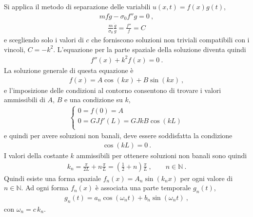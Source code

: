 \documentclass[letterpaper,10pt,italian]{jupyterBook}
\begin{document}
\sphinxAtStartPar
Si applica il metodo di separazione delle variabili \(u(x,t) = f(x) g(t)\),
\begin{equation*}
\begin{split}m f \ddot{g} - \sigma_0 f'' g = 0 \ ,\end{split}
\end{equation*}\begin{equation*}
\begin{split}\frac{m}{\sigma_0}\frac{\ddot{g}}{g} = \frac{f''}{f} = C\end{split}
\end{equation*}
\sphinxAtStartPar
e scegliendo solo i valori di \(c\) che forniscono soluzioni non triviali compatibili con i vincoli, \(C = - k^2\). L’equazione per la parte spaziale della soluzione diventa quindi
\begin{equation*}
\begin{split}f''(x) + k^2 f(x) = 0 \ .\end{split}
\end{equation*}
\sphinxAtStartPar
La soluzione generale di questa equazione è
\begin{equation*}
\begin{split}f(x) = A \cos (kx) + B \sin (kx) \ ,\end{split}
\end{equation*}
\sphinxAtStartPar
e l’imposizione delle condizioni al contorno consentono di trovare i valori ammissibili di \(A\), \(B\) e una condizione su \(k\),
\begin{equation*}
\begin{split}\begin{cases}
  0 = f(0) = A \\
  0 = GJf'(L) = GJ k B \cos (kL) \\
\end{cases}\end{split}
\end{equation*}
\sphinxAtStartPar
e quindi per avere soluzioni non banali, deve essere soddisfatta la condizione
\begin{equation*}
\begin{split}\cos(kL) = 0 \ .\end{split}
\end{equation*}
\sphinxAtStartPar
I valori della costante \(k\) ammissibili per ottenere soluzioni non banali sono quindi
\begin{equation*}
\begin{split}k_n = \frac{\pi}{2L} + n \frac{\pi}{L} = \left(\frac{1}{2} + n\right) \frac{\pi}{L} \ , \qquad n \in \mathbb{N} \ .\end{split}
\end{equation*}
\sphinxAtStartPar
Quindi esiste una forma spaziale \(f_n(x) = A_n \sin \left( k_n x \right)\) per ogni valore di \(n \in \mathbb{N}\). Ad ogni forma \(f_n(x)\) è associata una parte temporale \(g_n(t)\),
\begin{equation*}
\begin{split}g_n(t) = a_n \cos\left( \omega_n t \right) + b_n \sin\left( \omega_n t \right) \ ,\end{split}
\end{equation*}
\sphinxAtStartPar
con \(\omega_n = c \, k_n\).
\end{document}
